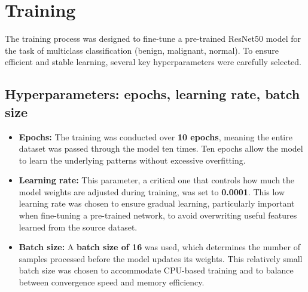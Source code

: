 
\section{Training}

The training process was designed to fine-tune a pre-trained ResNet50 model for the task of 
multiclass classification (benign, malignant, normal). To ensure efficient and stable learning, 
several key hyperparameters were carefully selected.


\subsection{Hyperparameters: epochs, learning rate, batch size}

\begin{itemize}
    \item \textbf{Epochs:} The training was conducted over \textbf{10 epochs}, meaning the entire 
    dataset was passed through the model ten times. Ten epochs allow the model to learn the 
    underlying patterns without excessive overfitting.

    \item \textbf{Learning rate:} This parameter, a critical one that controls how much the model 
    weights are adjusted during training, was set to \textbf{0.0001}. This low learning rate was 
    chosen to ensure gradual learning, particularly important when fine-tuning a pre-trained 
    network, to avoid overwriting useful features learned from the source dataset.

    \item \textbf{Batch size:} A \textbf{batch size of 16} was used, which determines the number of 
    samples processed before the model updates its weights. This relatively small batch size was 
    chosen to accommodate CPU-based training and to balance between convergence speed and memory 
    efficiency.
\end{itemize}

